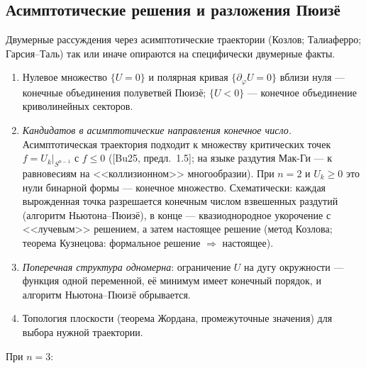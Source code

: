 \documentclass[11pt,a4paper]{article}
\theoremstyle{definition}
\begin{document}
\subsection{Асимптотические решения и разложения Пюизё}\label{sec:puiseux}
Двумерные рассуждения через асимптотические траектории (Козлов; Талиаферро; Гарсия--Таль) так или иначе
опираются на специфически двумерные факты.
\begin{enumerate}[leftmargin=*,label=(F\arabic*)]
\item Нулевое множество $\{U=0\}$ и полярная кривая $\{\partial_\varphi U=0\}$ вблизи нуля --- конечные
объединения полуветвей Пюизё; $\{U<0\}$ --- конечное объединение криволинейных секторов.
\item \emph{Кандидатов в асимптотические направления конечное число.} Асимптотическая траектория подходит
к множеству критических точек $f=U_k|_{S^{n-1}}$ с $f\le0$ ([Bu25, предл.~1.5]; на языке раздутия
Мак-Ги --- к равновесиям на <<коллизионном>> многообразии). При $n=2$ и $U_k\ge0$ это нули бинарной формы
--- конечное множество. Схематически: каждая вырожденная точка разрешается конечным числом взвешенных раздутий
(алгоритм Ньютона--Пюизё), в конце --- квазиоднородное укорочение с <<лучевым>> решением, а затем
настоящее решение (метод Козлова; теорема Кузнецова: формальное решение $\Rightarrow$ настоящее).
\item \emph{Поперечная структура одномерна}: ограничение $U$ на дугу окружности --- функция одной
переменной, её минимум имеет конечный порядок, и алгоритм Ньютона--Пюизё обрывается.
\item Топология плоскости (теорема Жордана, промежуточные значения) для выбора нужной траектории.
\end{enumerate}
При $n=3$:
\end{document}
